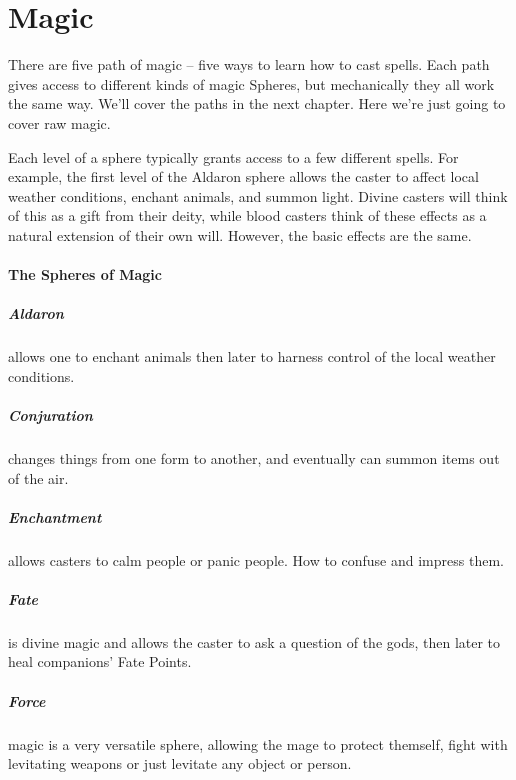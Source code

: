 \chapter{Magic}

\begin{multicols}{2}

There are five path of magic -- five ways to learn how to cast spells.
Each path gives access to different kinds of magic Spheres, but mechanically they all work the same way.
We'll cover the paths in the next chapter.  Here we're just going to cover raw magic.

Each level of a sphere typically grants access to a few different spells.
For example, the first level of the Aldaron sphere allows the caster to affect local weather conditions, enchant animals, and summon light.
Divine casters will think of this as a gift from their deity, while blood casters think of these effects as a natural extension of their own will.
However, the basic effects are the same.

\subsubsection{The Spheres of Magic}

\paragraph{Aldaron} allows one to enchant animals then later to harness control of the local weather conditions.

\paragraph{Conjuration} changes things from one form to another, and eventually can summon items out of the air.

\paragraph{Enchantment} allows casters to calm people or panic people. How to confuse and impress them.

\paragraph{Fate} is divine magic and allows the caster to ask a question of the gods, then later to heal companions' Fate Points.

\paragraph{Force} magic is a very versatile sphere, allowing the mage to protect themself, fight with levitating weapons or just levitate any object or person.


\end{multicols}
